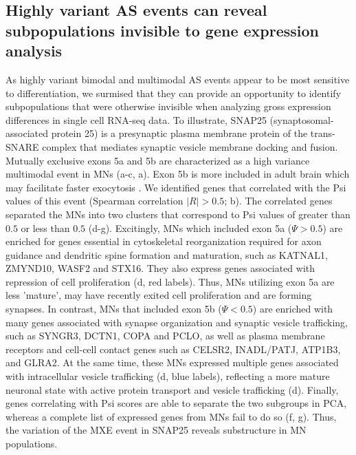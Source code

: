 \subsection{Highly variant AS events can reveal subpopulations invisible to gene expression analysis}

As highly variant bimodal and multimodal AS events appear to be most sensitive to differentiation, we surmised that they can provide an opportunity to identify subpopulations that were otherwise invisible when analyzing gross expression differences in single cell RNA-seq data. To illustrate, SNAP25 (synaptosomal-associated protein 25) is a presynaptic plasma membrane protein of the trans-SNARE complex that mediates synaptic vesicle membrane docking and fusion. Mutually exclusive exons 5a and 5b are characterized as a high variance multimodal event in MNs (a-c, a). Exon 5b is more included in adult brain \cite{Johansson:2008kx} which may facilitate faster exocytosis \cite{Nagy2008-ah}. We identified genes that correlated with the Psi values of this event (Spearman correlation $|R| > 0.5$; b). The correlated genes separated the MNs into two clusters that correspond to Psi values of greater than $0.5$ or less than $0.5$ (d-g). Excitingly, MNs which included exon 5a ($\Psi > 0.5$) are enriched for genes essential in cytoskeletal reorganization required for axon guidance and dendritic spine formation and maturation, such as KATNAL1, ZMYND10, WASF2 and STX16. They also express genes associated with repression of cell proliferation (d, red labels). Thus, MNs utilizing exon 5a are less 'mature', may have recently exited cell proliferation and are forming synapses. In contrast, MNs that included exon 5b ($\Psi < 0.5$) are enriched with many genes associated with synapse organization and synaptic vesicle trafficking, such as SYNGR3, DCTN1, COPA and PCLO, as well as plasma membrane receptors and cell-cell contact genes such as CELSR2, INADL/PATJ, ATP1B3, and GLRA2. At the same time, these MNs expressed multiple genes associated with intracellular vesicle trafficking (d, blue labels), reflecting a more mature neuronal state with active protein transport and vesicle trafficking (d). Finally, genes correlating with Psi scores are able to separate the two subgroups in PCA, whereas a complete list of expressed genes from MNs fail to do so (f, g). Thus, the variation of the MXE event in SNAP25 reveals substructure in MN populations.


